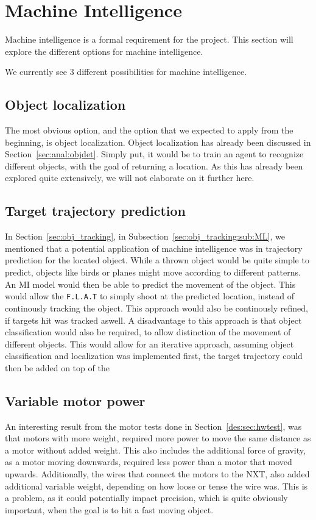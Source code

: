 \section{Machine Intelligence}\label{Design:MI}
Machine intelligence is a formal requirement for the project.
This section will explore the different options for machine intelligence.

We currently see 3 different possibilities for machine intelligence.

\subsection{Object localization}
The most obvious option, and the option that we expected to apply from the beginning, is object localization.
Object localization has already been discussed in Section~\ref{sec:anal:objdet}.
Simply put, it would be to train an agent to recognize different objects, with the goal of returning a location.
As this has already been explored quite extensively, we will not elaborate on it further here.

\subsection{Target trajectory prediction}
In Section~\ref{sec:obj_tracking}, in Subsection~\ref{sec:obj_tracking:sub:ML}, we mentioned that a potential application of machine intelligence was in trajectory prediction for the located object.
While a thrown object would be quite simple to predict, objects like birds or planes might move according to different patterns.
An MI model would then be able to predict the movement of the object.
This would allow the \texttt{F.L.A.T} to simply shoot at the predicted location, instead of continously tracking the object.
This approach would also be continously refined, if targets hit was tracked aswell.
A disadvantage to this approach is that object classification would also be required, to allow distinction of the movement of different objects.
This would allow for an iterative approach, assuming object classification and localization was implemented first, the target trajcetory could then be added on top of the

\subsection{Variable motor power}
An interesting result from the motor tests done in Section~\ref{des:sec:hwtest}, was that motors with more weight, required more power to move the same distance as a motor without added weight.
This also includes the additional force of gravity, as a motor moving downwards, required less power than a motor that moved upwards.
Additionally, the wires that connect the motors to the NXT, also added additional variable weight, depending on how loose or tense the wire was.
This is a problem, as it could potentially impact precision, which is quite obviously important, when the goal is to hit a fast moving object.

